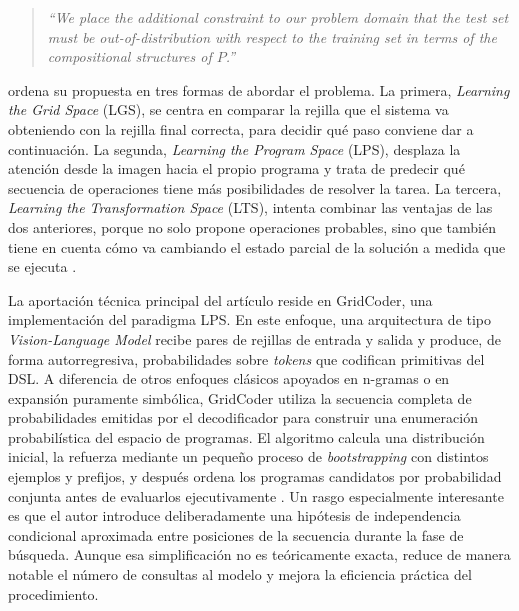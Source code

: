 \documentclass[11pt,a4paper,spanish]{book}
\numberwithin{equation}{chapter}
\numberwithin{figure}{chapter}
\begin{document}
\begin{quote}
\itshape
``We place the additional constraint to our problem domain that the test set must be out-of-distribution with respect to the training set in 
terms of the compositional structures of $P$.''
\end{quote}

\begin{center}
\cite[p.~2]{ouellette2024towards}
\end{center}

 ordena su propuesta en tres formas de abordar el problema. La primera, \textit{Learning the Grid Space} (LGS), 
se centra en comparar la rejilla que el sistema va obteniendo con la rejilla final correcta, para decidir qué paso conviene dar a continuación. 
La segunda, \textit{Learning the Program Space} (LPS), desplaza la atención desde la imagen hacia el propio programa y trata de predecir qué 
secuencia de operaciones tiene más posibilidades de resolver la tarea. La tercera, \textit{Learning the Transformation Space} (LTS), intenta 
combinar las ventajas de las dos anteriores, porque no solo propone operaciones probables, sino que también tiene en cuenta cómo va cambiando el 
estado parcial de la solución a medida que se ejecuta \cite{ouellette2024towards}.

La aportación técnica principal del artículo reside en GridCoder, una implementación del paradigma LPS. En este enfoque, una arquitectura de 
tipo \textit{Vision-Language Model} recibe pares de rejillas de entrada y salida y produce, de forma autorregresiva, probabilidades sobre \textit{tokens} que 
codifican primitivas del DSL. A diferencia de otros enfoques clásicos apoyados en n-gramas o en expansión puramente simbólica, GridCoder utiliza la 
secuencia completa de probabilidades emitidas por el decodificador para construir una enumeración probabilística del espacio de programas. El algoritmo 
calcula una distribución inicial, la refuerza mediante un pequeño proceso de \textit{bootstrapping} con distintos ejemplos y prefijos, y después ordena 
los programas candidatos por probabilidad conjunta antes de evaluarlos ejecutivamente \cite{ouellette2024towards}. Un rasgo especialmente interesante 
es que el autor introduce deliberadamente una hipótesis de independencia condicional aproximada entre posiciones de la secuencia durante la fase de 
búsqueda. Aunque esa simplificación no es teóricamente exacta, reduce de manera notable el número de consultas al modelo y mejora la eficiencia práctica 
del procedimiento.
\end{document}
